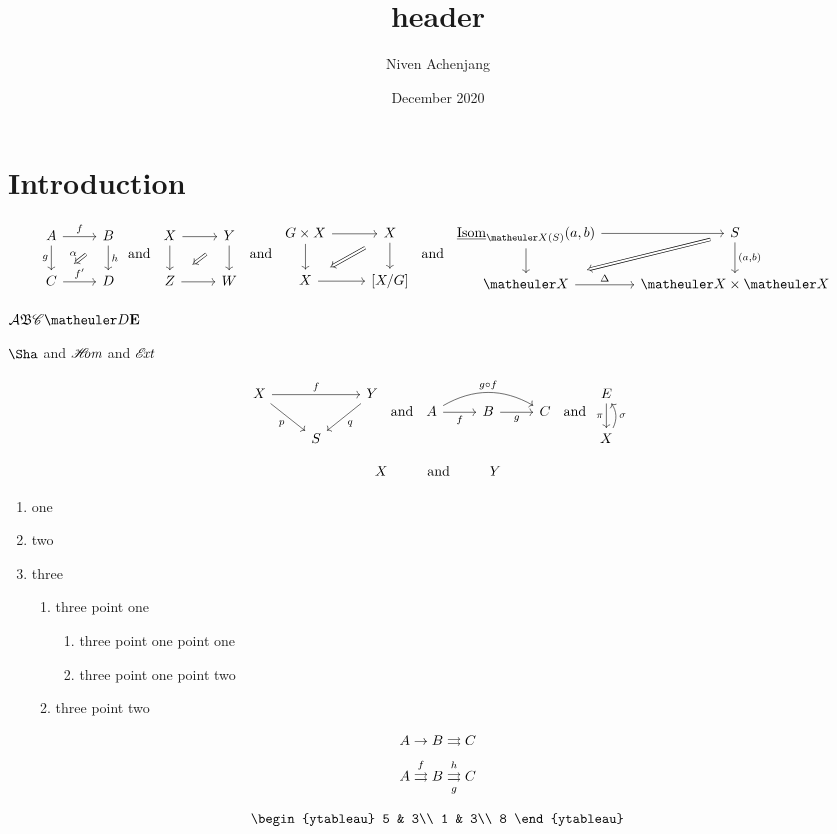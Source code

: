 \documentclass{article}
\title{header}
\author{Niven Achenjang}
\date{December 2020}
\numberwithin{thm}{section}
\numberwithin{prob}{section}
\numberwithin{equation}{section}
\begin{document}
\maketitle

\section{Introduction}

$$\twocommsquare AfBghC{f'}D\alpha\tand\baretwocommsquare XYZW\tand\baretwocommsquare{G\by X}XX{[X/G]}\tand\twocommsquare{\ul\Isom_{\meX(S)}(a,b)}{}S{}{(a,b)}\meX\Delta{\meX\by\meX}{}$$

$\mcA\mf B\msC\meD\mbf E$

$\Sha$ and $\sHom$ and $\sExt$

$$\mapover XfYpqS\tand\compdiag AfBgC{g\circ f}\tand\mapwithsect E\pi X\sigma$$

$$X\Text{and}\sspacing Y$$

\begin{enumerate}
    \item one
    \item two
    \item three
    \begin{enumerate}
        \item three point one
        \begin{enumerate}
            \item three point one point one
            \item three point one point two
        \end{enumerate}
        \item three point two
    \end{enumerate}
\end{enumerate}
$$A\to B\toto C$$
$$A \xtoto fB \xtoto[g]h C$$

$$\begin{ytableau}
    5 & 3\\
    1 & 3\\
    8
\end{ytableau}$$
\end{document}

